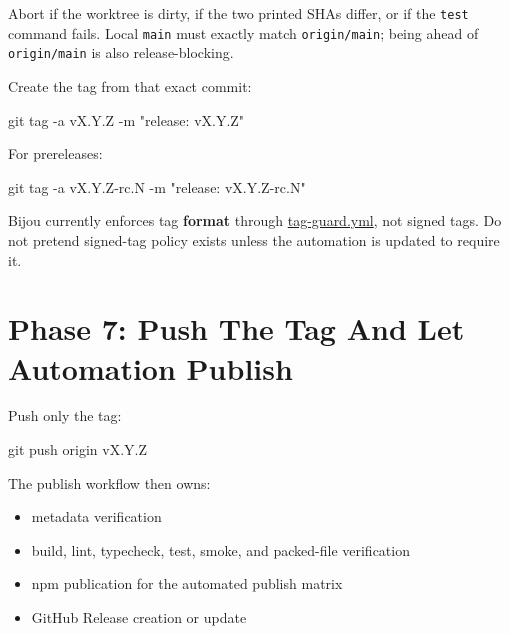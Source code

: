 Abort if the worktree is dirty, if the two printed SHAs differ, or if the \texttt{t\allowbreak{}e\allowbreak{}s\allowbreak{}t} command fails. Local \texttt{m\allowbreak{}a\allowbreak{}i\allowbreak{}n} must exactly match \texttt{o\allowbreak{}r\allowbreak{}i\allowbreak{}g\allowbreak{}i\allowbreak{}n\allowbreak{}/\allowbreak{}m\allowbreak{}a\allowbreak{}i\allowbreak{}n}; being ahead of \texttt{o\allowbreak{}r\allowbreak{}i\allowbreak{}g\allowbreak{}i\allowbreak{}n\allowbreak{}/\allowbreak{}m\allowbreak{}a\allowbreak{}i\allowbreak{}n} is also release-blocking.

Create the tag from that exact commit:

\begin{CodeBlock}
git tag -a vX.Y.Z -m "release: vX.Y.Z"
\end{CodeBlock}

For prereleases:

\begin{CodeBlock}
git tag -a vX.Y.Z-rc.N -m "release: vX.Y.Z-rc.N"
\end{CodeBlock}

Bijou currently enforces tag \textbf{format} through \href{https://github.com/flyingrobots/bijou/blob/cbd70612140e7a450d764b3c7be1c6af878b99bc/.github/workflows/tag-guard.yml}{tag-guard.yml}, not signed tags. Do not pretend signed-tag policy exists unless the automation is updated to require it.

\section{Phase 7: Push The Tag And Let Automation Publish}\label{record-274-phase-7-push-the-tag-and-let-automation-publish}

Push only the tag:

\begin{CodeBlock}
git push origin vX.Y.Z
\end{CodeBlock}

The publish workflow then owns:

\begin{itemize}
\tightlist
\item
  metadata verification
\item
  build, lint, typecheck, test, smoke, and packed-file verification
\item
  npm publication for the automated publish matrix
\item
  GitHub Release creation or update
\end{itemize}

